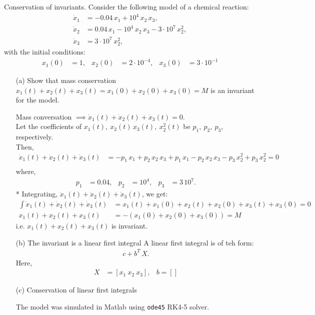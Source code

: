 Conservation of invariants. Consider the following model of a chemical reaction:
\begin{align*}
	\dot x_1 &= -0.04\,x_1 + 10^4\,x_2\,x_3,\\
	\dot x_2 &= 0.04\,x_1 - 10^4\,x_2\,x_3 - 3\cdot 10^7\,x_2^2,\\
	\dot x_3 &= 3\cdot 10^7\,x_2^2,
\end{align*}
with the initial conditions:
\begin{align*}
	x_1(0) &= 1, & x_2(0) &= 2\cdot 10^{-4}, & x_3(0) &= 3\cdot10^{-1}
\end{align*}
\begin{enumerate}
	\item[(a)] Show that mass conservation $x_1(t)+x_2(t)+x_3(t) = x_1(0)+x_2(0)+x_3(0) =  M$ is an invariant for the model.
	
	Mass conversation $\implies \dot x_1(t)+\dot x_2(t)+\dot x_3(t) = 0$. \\
	Let the coefficients of $x_1(t),\ x_2(t)\,x_3(t),\ x_2^2(t)$ be $p_1,\ p_2,\ p_3$, respectively. \\
	Then, 
	\begin{align*}
		\dot x_1(t)+\dot x_2(t)+\dot x_3(t) &= -p_1\,x_1 + p_2\, x_2\,x_3 + p_1\,x_1 - p_2\,x_2\,x_3 - p_3\,x_2^2 + p_3\,x_2^2 = 0\\
	\end{align*}
	where, 
	\begin{align*}
		p_1 &= 0.04, & p_2 &= 10^4, & p_3 &= 3\,10^7. 
	\end{align*}*
	Integrating, $\dot x_1(t)+\dot x_2(t)+\dot x_3(t)$, we get: 
	\begin{align*}
		\int \dot x_1(t)+\dot x_2(t)+\dot x_3(t) &= x_1(t) + x_1(0) + x_2(t) + x_2(0) + x_3(t) + x_3(0) = 0\\
		x_1(t) + x_2(t) + x_3(t) &= -(x_1(0) + x_2(0) + x_3(0)) = M
	\end{align*}
	i.e. $x_1(t) + x_2(t) + x_3(t)$ is invariant.
	\item[(b)] The invariant is a linear first integral
	A linear first integral is of teh form:
	\begin{align*}
		c + b^T\,X.
	\end{align*}
	Here,
	\begin{align*}
		X &= [x_1\ x_2\ x_3], & b = []
	\end{align*}
	\item[(c)] Conservation of linear first integrals
	
	The model was simulated in Matlab using \texttt{ode45} RK4-5 solver.
	

\end{enumerate}
